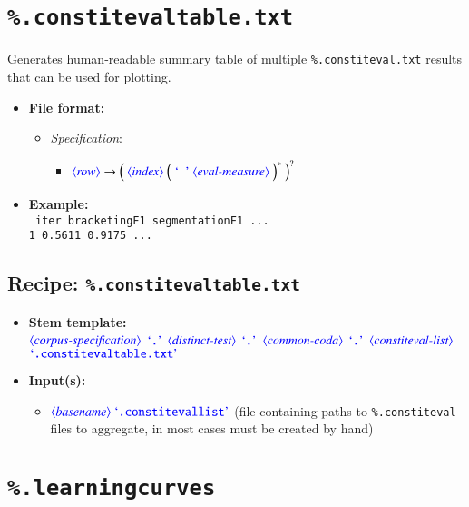 \documentclass[12pt]{report}
\def\blue{\color{blue}}
\def\magenta{\color{magenta}}
\begin{document}
\section{\blue\tt \%.constitevaltable.txt}

Generates human-readable summary table of multiple {\blue\tt \%.constiteval.txt} results that can be used for plotting.

\begin{itemize}
      \item \textbf{File format:}
      \begin{itemize}
            \item \textit{Specification}:
            \begin{itemize}
                  \item $\dtype{row} \rightarrow \Big( \ \dtype{index} \ \Big( \ \dcode{\ } \ \dtype{eval-measure} \ \Big)^* \ \Big)^?$
            \end{itemize}
      \end{itemize}
      \item \textbf{Example:}\\
      {\magenta\tt
      iter bracketingF1 segmentationF1 ...\\
      1 0.5611 0.9175 ...}
\end{itemize}

\subsection{Recipe: {\blue\tt \%.constitevaltable.txt}}

\begin{itemize}
      \item \textbf{Stem template:}\\
      $\dtype{corpus-specification}$ $\dcode{.}$ $\dtype{distinct-test}$ $\dcode{.}$ $\dtype{common-coda}$ $\dcode{.}$ $\dtype{constiteval-list}$ $\dcode{.constitevaltable.txt}$
      \item \textbf{Input(s):}
      \begin{itemize}
            \item  $\dtype{basename} \ \dcode{.constitevallist}$ (file containing paths to {\blue\tt \%.constiteval} files to aggregate, in most cases must be created by hand)
      \end{itemize}
\end{itemize}

\section{\blue\tt \%.learning\textunderscore curves}
\end{document}

